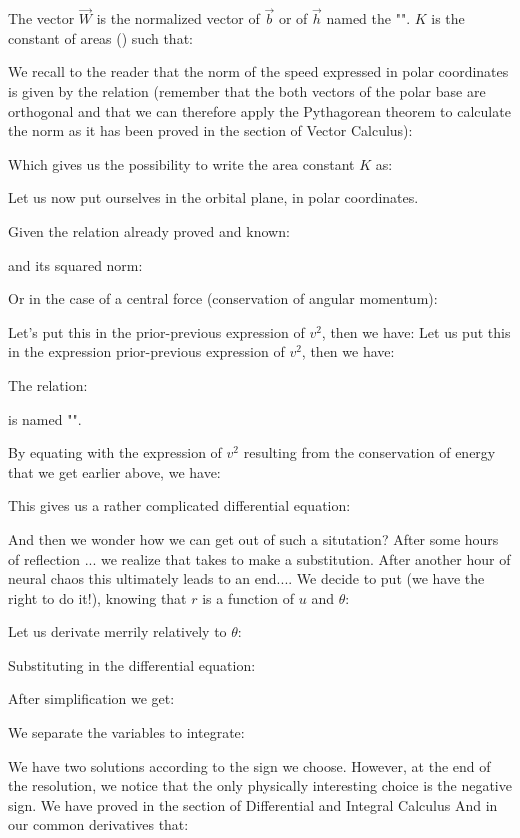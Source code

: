 	The vector $\vec{W}$ is the normalized vector of $\vec{b}$ or of $\vec{h}$ named the "". $K$ is the constant of areas () such that:
	
	We recall to the reader that the norm of the speed expressed in polar coordinates is given by the relation (remember that the both vectors of the polar base are orthogonal and that we can therefore apply the Pythagorean theorem to calculate the norm as it has been proved in the section of Vector Calculus):
	
	Which gives us the possibility to write the area constant $K$ as:
	
	Let us now put ourselves in the orbital plane, in polar coordinates.
	
	Given the relation already proved and known:
	
	and its squared norm:
	
	Or in the case of a central force (conservation of angular momentum):
	
	Let's put this in the prior-previous expression of $v^2$, then we have:
	Let us put this in the expression prior-previous expression of $v^2$, then we have:
	
	The relation:
	
	is named "".
	
	By equating with the expression of $v^2$ resulting from the conservation of energy that we get earlier above, we have:
	
	This gives us a rather complicated differential equation:
	
	And then we wonder how we can get out of such a situtation? After some hours of reflection ... we realize that takes to make a substitution. After another hour of neural chaos this ultimately leads to an end.... We decide to put (we have the right to do it!), knowing that $r$ is a function of $u$ and $\theta$:
	
	Let us derivate merrily relatively to $\theta$:
	
	Substituting in the differential equation:
	
	After simplification we get:
	
	We separate the variables to integrate:
	
	We have two solutions according to the sign we choose. However, at the end of the resolution, we notice that the only physically interesting choice is the negative sign. We have proved in the section of Differential and Integral Calculus And in our common derivatives that:
	
